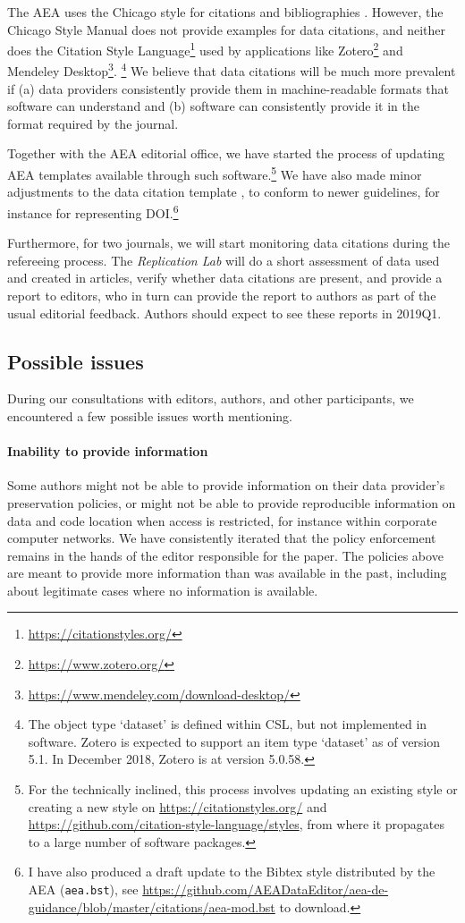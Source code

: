 \documentclass[AEJ]{AEA}
\newcommand{\urlcite}[2]{#2\footnote{\url{#1}}}
\begin{document}
The AEA uses the Chicago style for citations and bibliographies \citep{aeadatarefs}. However, the Chicago Style Manual \citep{citation-machine,ChicagoManualofStyleChicagoManualStyle2018} does not provide examples for data citations, and neither does the \urlcite{https://citationstyles.org/}{Citation Style Language} used by applications like \urlcite{https://www.zotero.org/}{Zotero} and \urlcite{https://www.mendeley.com/download-desktop/}{Mendeley Desktop}.%
\footnote{The object type `dataset' is defined within CSL, but not implemented in software. Zotero is expected to support an item type `dataset' as of version 5.1. In December 2018, Zotero is at version 5.0.58.}
We believe that data citations will be much more prevalent if (a) data providers consistently provide them in machine-readable formats that software can understand and (b) software can consistently provide it in the format required by the journal.

Together with the  AEA editorial office, we have   started the process of updating AEA templates available through such software.\footnote{For the technically inclined, this process involves updating an existing style or creating a new style on \url{https://citationstyles.org/} and \url{https://github.com/citation-style-language/styles}, from where it propagates to a large number of software packages.} We have also made minor adjustments to the data citation template \citep{aeadatarefs}, to conform to newer guidelines, for instance for representing \ac{DOI}.\footnote{I have also produced a draft update to the Bibtex style distributed by the AEA (\texttt{aea.bst}), see  \url{https://github.com/AEADataEditor/aea-de-guidance/blob/master/citations/aea-mod.bst} to download.}

Furthermore, for two journals, we will start monitoring data citations during the refereeing process. The \textit{Replication Lab} will do a short assessment of data used and created in articles, verify whether data citations are present, and provide a report to editors, who in turn can provide the report to authors as part of the usual editorial feedback. Authors should expect to see these reports in 2019Q1.

\subsection{Possible issues}
During our consultations with editors, authors, and other participants, we encountered a few possible issues worth mentioning.

\paragraph{Inability to provide information} Some authors might not be able to provide information on their data provider's preservation policies, or might not be able to provide reproducible information on data and code location when access is restricted, for instance within corporate computer networks. We have consistently iterated that the policy enforcement remains in the hands of the editor responsible for the paper. The policies above are meant to provide more information than was available in the past, including about legitimate cases where no information is available.
\end{document}

